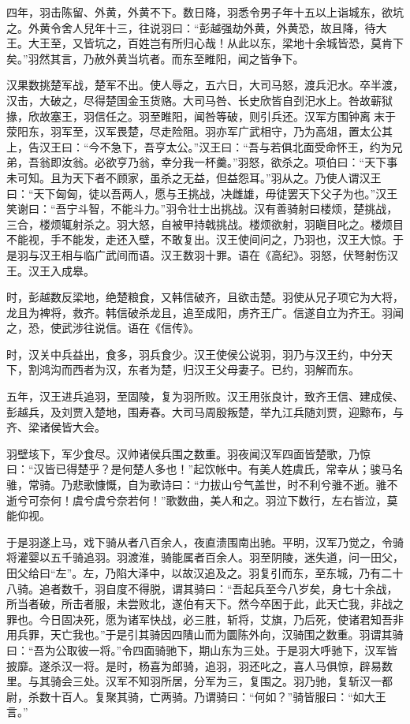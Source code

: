 \documentclass[12pt,UTF8]{ctexbook}
\begin{document}
四年，羽击陈留、外黄，外黄不下。数日降，羽悉令男子年十五以上诣城东，欲坑之。外黄令舍人兒年十三，往说羽曰：“彭越强劫外黄，外黄恐，故且降，待大王。大王至，又皆坑之，百姓岂有所归心哉！从此以东，梁地十余城皆恐，莫肯下矣。”羽然其言，乃赦外黄当坑者。而东至睢阳，闻之皆争下。



汉果数挑楚军战，楚军不出。使人辱之，五六日，大司马怒，渡兵汜水。卒半渡，汉击，大破之，尽得楚国金玉货赂。大司马咎、长史欣皆自刭汜水上。咎故蕲狱掾，欣故塞王，羽信任之。羽至睢阳，闻咎等破，则引兵还。汉军方围钟离末于荥阳东，羽军至，汉军畏楚，尽走险阻。羽亦军广武相守，乃为高俎，置太公其上，告汉王曰：“今不急下，吾亨太公。”汉王曰：“吾与若俱北面受命怀王，约为兄弟，吾翁即汝翁。必欲亨乃翁，幸分我一杯羹。”羽怒，欲杀之。项伯曰：“天下事未可知。且为天下者不顾家，虽杀之无益，但益怨耳。”羽从之。乃使人谓汉王曰：“天下匈匈，徒以吾两人，愿与王挑战，决雌雄，毋徒罢天下父子为也。”汉王笑谢曰：“吾宁斗智，不能斗力。”羽令壮士出挑战。汉有善骑射曰楼烦，楚挑战，三合，楼烦辄射杀之。羽大怒，自被甲持戟挑战。楼烦欲射，羽瞋目叱之。楼烦目不能视，手不能发，走还入壁，不敢复出。汉王使间问之，乃羽也，汉王大惊。于是羽与汉王相与临广武间而语。汉王数羽十罪。语在《高纪》。羽怒，伏弩射伤汉王。汉王入成皋。



时，彭越数反梁地，绝楚粮食，又韩信破齐，且欲击楚。羽使从兄子项它为大将，龙且为裨将，救齐。韩信破杀龙且，追至成阳，虏齐王广。信遂自立为齐王。羽闻之，恐，使武涉往说信。语在《信传》。



时，汉关中兵益出，食多，羽兵食少。汉王使侯公说羽，羽乃与汉王约，中分天下，割鸿沟而西者为汉，东者为楚，归汉王父母妻子。已约，羽解而东。



五年，汉王进兵追羽，至固陵，复为羽所败。汉王用张良计，致齐王信、建成侯、彭越兵，及刘贾入楚地，围寿春。大司马周殷叛楚，举九江兵随刘贾，迎黥布，与齐、梁诸侯皆大会。



羽壁垓下，军少食尽。汉帅诸侯兵围之数重。羽夜闻汉军四面皆楚歌，乃惊曰：“汉皆已得楚乎？是何楚人多也！”起饮帐中。有美人姓虞氏，常幸从；骏马名骓，常骑。乃悲歌慷慨，自为歌诗曰：“力拔山兮气盖世，时不利兮骓不逝。骓不逝兮可奈何！虞兮虞兮奈若何！”歌数曲，美人和之。羽泣下数行，左右皆泣，莫能仰视。



于是羽遂上马，戏下骑从者八百余人，夜直溃围南出驰。平明，汉军乃觉之，令骑将灌婴以五千骑追羽。羽渡淮，骑能属者百余人。羽至阴陵，迷失道，问一田父，田父给曰“左”。左，乃陷大泽中，以故汉追及之。羽复引而东，至东城，乃有二十八骑。追者数千，羽自度不得脱，谓其骑曰：“吾起兵至今八岁矣，身七十余战，所当者破，所击者服，未尝败北，遂伯有天下。然今卒困于此，此天亡我，非战之罪也。今日固决死，愿为诸军快战，必三胜，斩将，艾旗，乃后死，使诸君知吾非用兵罪，天亡我也。”于是引其骑因四隤山而为圜陈外向，汉骑围之数重。羽谓其骑曰：“吾为公取彼一将。”令四面骑驰下，期山东为三处。于是羽大呼驰下，汉军皆披靡。遂杀汉一将。是时，杨喜为郎骑，追羽，羽还叱之，喜人马俱惊，辟易数里。与其骑会三处。汉军不知羽所居，分军为三，复围之。羽乃驰，复斩汉一都尉，杀数十百人。复聚其骑，亡两骑。乃谓骑曰：“何如？”骑皆服曰：“如大王言。”
\end{document}
